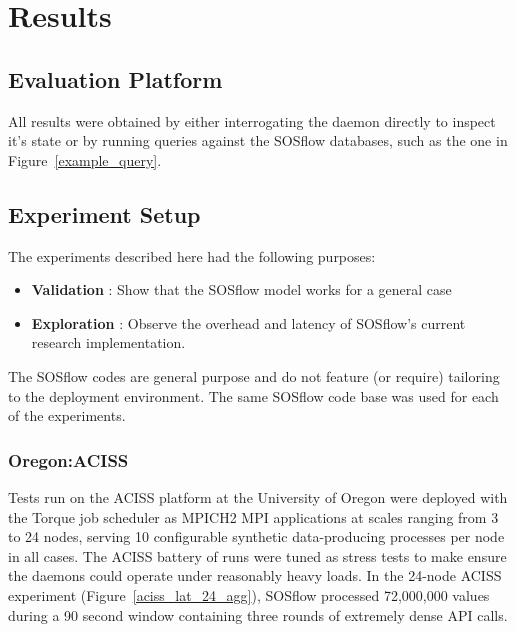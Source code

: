 
\section{Results} %
\subsection{Evaluation Platform} %
All results were obtained by either interrogating the daemon directly
to inspect it's state or by running queries against the SOSflow
databases, such as the one in Figure~\ref{example_query}.
%
%
%
%


\subsection{Experiment Setup} %
%
The experiments described here had the following purposes:
\begin{itemize}
\item \textbf{Validation} : Show that the SOSflow model works for a general case
\item \textbf{Exploration} : Observe the overhead and latency of
  SOSflow's current research implementation.
\end {itemize}
%
The SOSflow codes are general purpose and do not feature (or require)
tailoring to the deployment environment.
%
The same SOSflow code base was used for each of the experiments.
%
\subsubsection{Oregon:ACISS} %
Tests run on the ACISS platform at the University of Oregon were
deployed with the Torque job scheduler as MPICH2 MPI applications at
scales ranging from 3 to 24 nodes, serving 10 configurable synthetic
data-producing processes per node in all cases.
%
The ACISS battery of runs were tuned as stress tests to make ensure
the daemons could operate under reasonably heavy loads.
%
In the 24-node ACISS experiment (Figure~\ref{aciss_lat_24_agg}),
SOSflow processed 72,000,000 values during a 90 second window
containing three rounds of extremely dense API calls.
%
%
